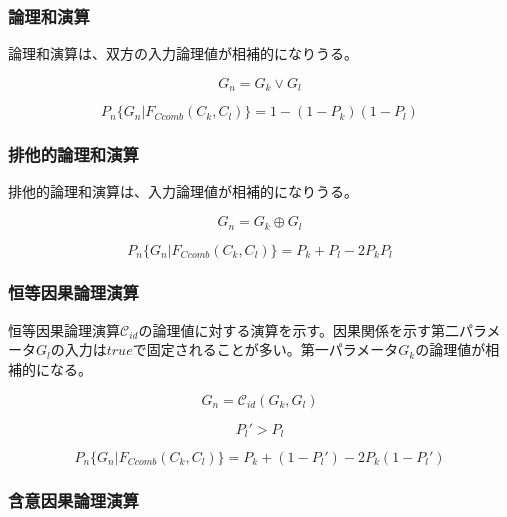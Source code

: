 \documentclass[12pt]{article}
\begin{document}
\subsubsection{論理和演算}\label{ux8ad6ux7406ux548cux6f14ux7b97}

論理和演算は、双方の入力論理値が相補的になりうる。

\begin{equation} G_n =G_k \vee G_l\end{equation}

\begin{equation} P_{n}\{G_{n}|F_{Ccomb}(C_{k},C_{l})\}=1-(1-P_{k})(1-P_{l})\end{equation}

\subsubsection{排他的論理和演算}\label{ux6392ux4ed6ux7684ux8ad6ux7406ux548cux6f14ux7b97}

排他的論理和演算は、入力論理値が相補的になりうる。

\begin{equation} G_n =G_k \oplus G_l\end{equation}

\begin{equation} P_{n}\{G_{n}|F_{Ccomb}(C_{k},C_{l})\}=P_{k}+P_{l}-2P_{k}P_{l}\end{equation}

\subsubsection{恒等因果論理演算}\label{ux6052ux7b49ux56e0ux679cux8ad6ux7406ux6f14ux7b97}

恒等因果論理演算\(\mathcal{C}_{id}\)の論理値に対する演算を示す。因果関係を示す第二パラメータ\(G_l\)の入力は\(true\)で固定されることが多い。第一パラメータ\(G_k\)の論理値が相補的になる。

\begin{equation} G_n =\mathcal{C}_{id}(G_k , G_l)\end{equation}

\begin{equation} P_{l}'>P_{l}\end{equation}

\begin{equation} P_{n}\{G_{n}|F_{Ccomb}(C_{k},C_{l})\}=P_{k}+(1-P_{l}')-2P_{k}(1-P_{l}')\end{equation}

\subsubsection{含意因果論理演算}\label{ux542bux610fux56e0ux679cux8ad6ux7406ux6f14ux7b97}
\end{document}
